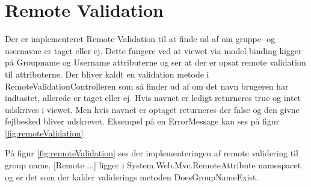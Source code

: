 \section{Remote Validation}
Der er implementeret Remote Validation til at finde ud af om gruppe- og usernavne er taget eller ej. Dette fungere ved at viewet via model-binding kigger på Groupname og Username attributerne og ser at der er opsat remote validation til attributerne. Der bliver kaldt en validation metode i RemoteValidationControlleren som så finder ud af om det navn brugeren har indtastet, allerede er taget eller ej. Hvis navnet er ledigt returneres true og intet udskrives i viewet. Men hvis navnet er optaget returneres der false og den givne fejlbesked bliver udskrevet. Eksempel på en ErrorMessage kan ses på figur \ref{fig:remoteValidation}


På figur \ref{fig:remoteValidation} ses der implementeringen af remote validering til group name. [Remote ...] ligger i System.Web.Mvc.RemoteAttribute namespacet og er det som der kalder validerings metoden DoesGroupNameExist.
